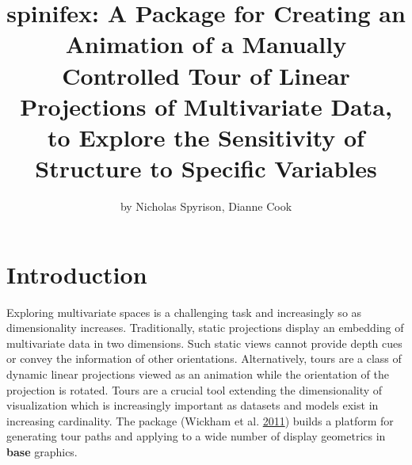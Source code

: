 \title{spinifex: A Package for Creating an Animation of a Manually Controlled
Tour of Linear Projections of Multivariate Data, to Explore the
Sensitivity of Structure to Specific Variables}
\author{by Nicholas Spyrison, Dianne Cook}

\maketitle





\hypertarget{introduction}{%
\section{Introduction}\label{introduction}}

Exploring multivariate spaces is a challenging task and increasingly so
as dimensionality increases. Traditionally, static projections display
an embedding of multivariate data in two dimensions. Such static views
cannot provide depth cues or convey the information of other
orientations. Alternatively, tours are a class of dynamic linear
projections viewed as an animation while the orientation of the
projection is rotated. Tours are a crucial tool extending the
dimensionality of visualization which is increasingly important as
datasets and models exist in increasing cardinality. The package
 (Wickham et al.
\protect\hyperlink{ref-wickham_tourr_2011}{2011}) builds a platform for
generating tour paths and applying to a wide number of display
geometrics in \textbf{base} graphics.

